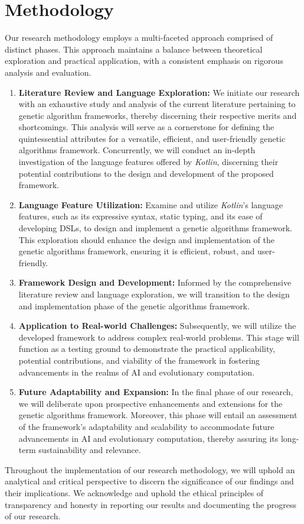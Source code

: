 \section{Methodology}
\label{sec:methodology}
  Our research methodology employs a multi-faceted approach comprised of distinct phases. This approach maintains a 
  balance between theoretical exploration and practical application, with a consistent emphasis on rigorous analysis 
  and evaluation.
  
  \begin{enumerate}
    \item \textbf{Literature Review and Language Exploration:} We initiate our research with an exhaustive study and 
      analysis of the current literature pertaining to genetic algorithm frameworks, thereby discerning their 
      respective merits and shortcomings. This analysis will serve as a cornerstone for defining the quintessential 
      attributes for a versatile, efficient, and user-friendly genetic algorithms framework. Concurrently, we will 
      conduct an in-depth investigation of the language features offered by \textit{Kotlin}, discerning their potential 
      contributions to the design and development of the proposed framework.
    \item \textbf{Language Feature Utilization:} Examine and utilize \textit{Kotlin}'s language features, such as
      its expressive syntax, static typing, and its ease of developing DSLs, to design and implement a genetic
      algorithms framework. This exploration should enhance the design and implementation of the genetic algorithms 
      framework, ensuring it is efficient, robust, and user-friendly.
    \item \textbf{Framework Design and Development:} Informed by the comprehensive literature review and language 
      exploration, we will transition to the design and implementation phase of the genetic algorithms framework.
    \item \textbf{Application to Real-world Challenges:} Subsequently, we will utilize the developed framework to 
      address complex real-world problems. This stage will function as a testing ground to demonstrate the practical 
      applicability, potential contributions, and viability of the framework in fostering advancements in the realms of 
      AI and evolutionary computation.
    \item \textbf{Future Adaptability and Expansion:} In the final phase of our research, we will deliberate upon 
      prospective enhancements and extensions for the genetic algorithms framework. Moreover, this phase will entail an 
      assessment of the framework's adaptability and scalability to accommodate future advancements in AI and 
      evolutionary computation, thereby assuring its long-term sustainability and relevance.
  \end{enumerate}

  Throughout the implementation of our research methodology, we will uphold an analytical and critical perspective to 
  discern the significance of our findings and their implications. We acknowledge and uphold the ethical principles of 
  transparency and honesty in reporting our results and documenting the progress of our research.
